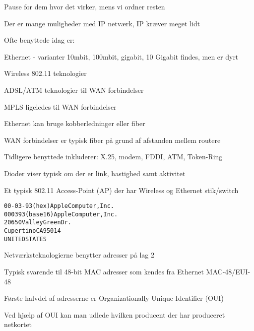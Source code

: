 \documentclass[Screen16to9,17pt,footrule]{foils}
\begin{document}
\centerline{Pause for dem hvor det virker, mens vi ordner resten}






\begin{list1}
\item Der er mange muligheder med IP netværk, IP kræver meget lidt
\item Ofte benyttede idag er:
\begin{list2}
\item Ethernet - varianter 10mbit, 100mbit, gigabit, 10 Gigabit findes, men er dyrt
\item Wireless 802.11 teknologier
\item ADSL/ATM teknologier til WAN forbindelser
\item MPLS ligeledes til WAN forbindelser
\end{list2}
\item Ethernet kan bruge kobberledninger eller fiber
\item WAN forbindelser er typisk fiber på grund af afstanden mellem routere
\item Tidligere benyttede inkluderer: X.25, modem, FDDI, ATM, Token-Ring
\end{list1}



\centerline{Dioder viser typisk om der er link, hastighed samt aktivitet}



\begin{list1}
\item Et typisk 802.11 Access-Point (AP) der har Wireless og Ethernet stik/switch
\end{list1}


\begin{alltt}
00-03-93   (hex)        Apple Computer, Inc.
000393     (base 16)    Apple Computer, Inc.
                        20650 Valley Green Dr.
                        Cupertino CA 95014
                        UNITED STATES
\end{alltt}
\begin{list1}
\item Netværksteknologierne benytter adresser på lag 2
\item Typisk svarende til 48-bit MAC adresser som kendes fra Ethernet MAC-48/EUI-48
\item Første halvdel af adresserne er Organizationally Unique Identifier (OUI)
\item Ved hjælp af OUI kan man udlede hvilken producent der har produceret netkortet
\item {}
\end{list1}
\end{document}

